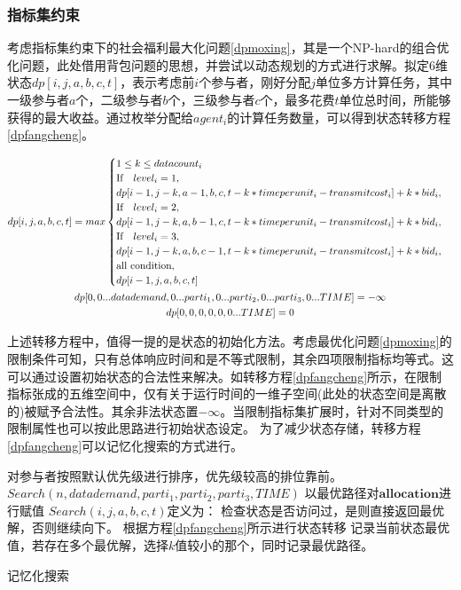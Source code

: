 \documentclass[promaster]{thesis-uestc}
\begin{document}
\FloatBarrier

\subsubsection{指标集约束}
\label{dptou}

考虑指标集约束下的社会福利最大化问题\ref{dpmoxing}，其是一个NP-hard的组合优化问题，此处借用背包问题的思想，并尝试以动态规划的方式进行求解。拟定6维状态$dp[i,j,a,b,c,t]$，表示考虑前$i$个参与者，刚好分配$j$单位多方计算任务，其中一级参与者$a$个，二级参与者$b$个，三级参与者$c$个，最多花费$t$单位总时间，所能够获得的最大收益。通过枚举分配给$agent_i$的计算任务数量，可以得到状态转移方程\ref{dpfangcheng}。

\begin{gather}
\label{dpfangcheng}  
dp[i,j,a,b,c,t] = max
\begin{cases}
1 \leq k \leq datacount_i \\
\text{If} \quad level_i = 1,\\
dp[i-1,j-k,a-1,b,c,t-k*timeperunit_i-transmitcost_i]+ k*bid_i,\\
\text{If}\quad level_i = 2,\\
dp[i-1,j-k,a,b-1,c,t-k*timeperunit_i-transmitcost_i]+ k*bid_i,\\
\text{If} \quad level_i = 3,\\
dp[i-1,j-k,a,b,c-1,t-k*timeperunit_i-transmitcost_i]+ k*bid_i,\\
\text{all condition},\\
dp[i-1,j,a,b,c,t]
\end{cases}\\
dp[0,0...datademand,0...parti_1,0...parti_2,0...parti_3,0...TIME] =-\infty \notag\\
dp[0,0,0,0,0,0...TIME] = 0 \notag
\end{gather}

上述转移方程中，值得一提的是状态的初始化方法。考虑最优化问题\ref{dpmoxing}的限制条件可知，只有总体响应时间和是不等式限制，其余四项限制指标均等式。这可以通过设置初始状态的合法性来解决。如转移方程\ref{dpfangcheng}所示，在限制指标张成的五维空间中，仅有关于运行时间的一维子空间(此处的状态空间是离散的)被赋予合法性。其余非法状态置$-\infty$。当限制指标集扩展时，针对不同类型的限制属性也可以按此思路进行初始状态设定。
为了减少状态存储，转移方程\ref{dpfangcheng}可以记忆化搜索的方式进行。

\begin{algorithm}[H]
    对参与者按照默认优先级进行排序，优先级较高的排位靠前。
    $Search(n,datademand,parti_1,parti_2,parti_3,TIME)$\;
    以最优路径对$\mathbf{allocation}$进行赋值\;
    \;
    $Search(i,j,a,b,c,t)$定义为：\;
    检查状态是否访问过，是则直接返回最优解，否则继续向下。\;
    根据方程\ref{dpfangcheng}所示进行状态转移\;
    记录当前状态最优值，若存在多个最优解，选择$k$值较小的那个，同时记录最优路径。\;
\caption{记忆化搜索}
\label{jiyihua}
\end{algorithm}
\end{document}

